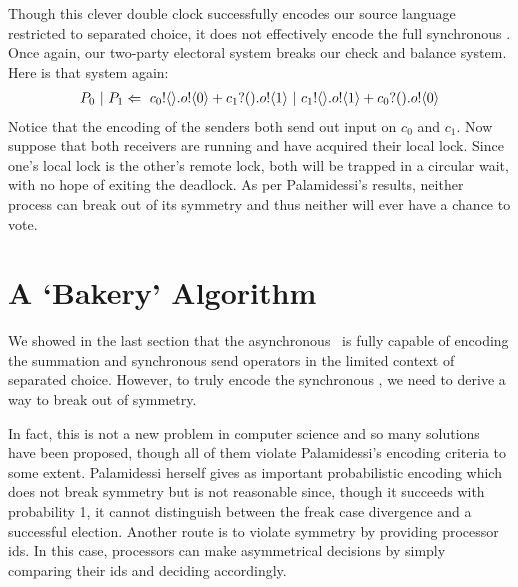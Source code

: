 Though this clever double clock successfully encodes our source language restricted to separated choice, it does not effectively encode the full synchronous \picalc.  Once again, our two-party electoral system breaks our check and balance system.  Here is that system again:
\begin{align}
	P_0\ |\  P_1 \Leftarrow\  {c_0}!\langle{}\rangle. {o}!\langle{0}\rangle + {c_1}?({}). {o}!\langle{1}\rangle \ |\  {c_1}!\langle{}\rangle. {o}!\langle{1}\rangle + {c_0}?({}). {o}!\langle{0}\rangle
\end{align}
Notice that the encoding of the senders both send out input on $c_0$ and $c_1$.  Now suppose that both receivers are running and have acquired their local lock.  Since one's local lock is the other's remote lock, both will be trapped in a circular wait, with no hope of exiting the deadlock.  As per Palamidessi's results, neither process can break out of its symmetry and thus neither will ever have a chance to vote.

\section{A `Bakery' Algorithm}
We showed in the last section that the asynchronous \picalc\ is fully capable of encoding the summation and synchronous send operators in the limited context of separated choice.
However, to truly encode the synchronous \picalc, we need to derive a way to break out of symmetry.

In fact, this is not a new problem in computer science and so many solutions have been proposed, though all of them violate Palamidessi's encoding criteria to some extent.
Palamidessi herself gives as important probabilistic encoding \cite{palam01} which does not break symmetry but is not reasonable since, though it succeeds with probability 1, it cannot distinguish between the freak case divergence and a successful election.
Another route is to violate symmetry by providing processor ids.
In this case, processors can make asymmetrical decisions by simply comparing their ids and deciding accordingly.

